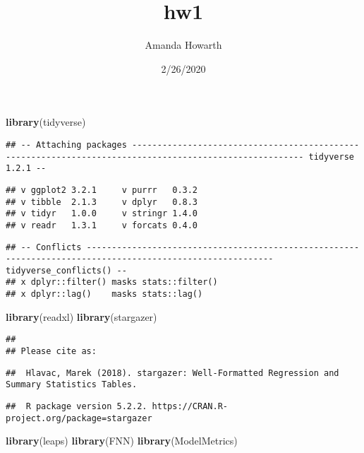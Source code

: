 \documentclass[]{article}
\title{hw1}
\author{Amanda Howarth}
\date{2/26/2020}
\newenvironment{Shaded}{\begin{snugshade}}{\end{snugshade}}
\newcommand{\KeywordTok}[1]{\textcolor[rgb]{0.13,0.29,0.53}{\textbf{#1}}}
\newcommand{\NormalTok}[1]{#1}
\begin{document}
\maketitle

\begin{Shaded}
\begin{Highlighting}[]
\KeywordTok{library}\NormalTok{(tidyverse)}
\end{Highlighting}
\end{Shaded}

\begin{verbatim}
## -- Attaching packages -------------------------------------------------------------------------------------------------------- tidyverse 1.2.1 --
\end{verbatim}

\begin{verbatim}
## v ggplot2 3.2.1     v purrr   0.3.2
## v tibble  2.1.3     v dplyr   0.8.3
## v tidyr   1.0.0     v stringr 1.4.0
## v readr   1.3.1     v forcats 0.4.0
\end{verbatim}

\begin{verbatim}
## -- Conflicts ----------------------------------------------------------------------------------------------------------- tidyverse_conflicts() --
## x dplyr::filter() masks stats::filter()
## x dplyr::lag()    masks stats::lag()
\end{verbatim}

\begin{Shaded}
\begin{Highlighting}[]
\KeywordTok{library}\NormalTok{(readxl)}
\KeywordTok{library}\NormalTok{(stargazer) }
\end{Highlighting}
\end{Shaded}

\begin{verbatim}
## 
## Please cite as:
\end{verbatim}

\begin{verbatim}
##  Hlavac, Marek (2018). stargazer: Well-Formatted Regression and Summary Statistics Tables.
\end{verbatim}

\begin{verbatim}
##  R package version 5.2.2. https://CRAN.R-project.org/package=stargazer
\end{verbatim}

\begin{Shaded}
\begin{Highlighting}[]
\KeywordTok{library}\NormalTok{(leaps)}
\KeywordTok{library}\NormalTok{(FNN)}
\KeywordTok{library}\NormalTok{(ModelMetrics)}
\end{Highlighting}
\end{Shaded}
\end{document}
